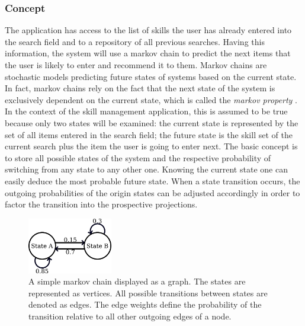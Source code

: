 \newpage

\subsubsection{Concept}
The application has access to the list of skills the user has already entered into the search field and to a repository of all previous searches. Having this information, the system will use a markov chain to predict the next items that the user is likely to enter and recommend it to them.
Markov chains are stochastic models predicting future states of systems based on the current state. In fact, markov chains rely on the fact that the next state of the system is exclusively dependent on the current state, which is called the \textit{markov property} \cite{markprop}. In the context of the skill management application, this is assumed to be true because only two states will be examined: the current state is represented by the set of all items entered in the search field; the future state is the skill set of the current search plus the item the user is going to enter next.
The basic concept is to store all possible states of the system and the respective probability of switching from any state to any other one.
Knowing the current state one can easily deduce the most probable future state. When a state transition occurs, the outgoing probabilities of the origin states
can be adjusted accordingly in order to factor the transition into the prospective projections.
\begin{figure}[!htp]
    \centering
    \includegraphics[width=0.33\textwidth]{images/markov_basic.png}
    \caption[Diagram: Markov Chain]{A simple markov chain displayed as a graph. The states are represented as vertices. All possible transitions between states are denoted as edges. The edge weights define the probability of the transition relative to all other outgoing edges of a node.}
    \label{fig:markovchain}
\end{figure}

\newpage

